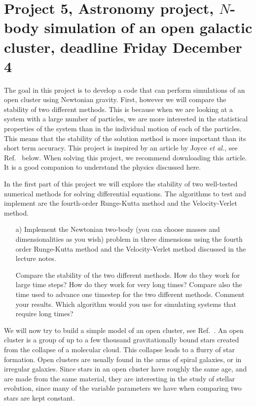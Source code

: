 \documentclass[11pt,a4wide]{article}
\begin{document}
\section*{Project 5, Astronomy project, $N$-body simulation of an open galactic cluster, deadline  Friday December 4}




The goal in this project is to develop a code that can perform simulations of an
open cluster using Newtonian gravity. First, however we will compare
the stability of two different methods. This is because when we are
looking at a system with a large number of particles, we are more
interested in the statistical properties of the system than in the
individual motion of each of the particles. This means that the
stability of the solution method is more important than its short term
accuracy.  This project is inspired by an article by Joyce {\em et al.}, see Ref.~\cite{joyce2010} below.
When  solving this project, we recommend downloading this article. It is a good companion to understand the 
physics discussed here. 

In the first part of this project we will explore the stability of two
well-tested numerical methods for solving differential equations. The algorithms to test and implement are the fourth-order Runge-Kutta method and the Velocity-Verlet method. 

\begin{enumerate}
\item[a)] Implement the Newtonian two-body (you can choose masses and dimensionalities as
  you wish) problem in three dimensions using the fourth order
  Runge-Kutta method and the Velocity-Verlet method discussed in
  the lecture notes.

 Compare the
stability of the two different methods. How do they work for large
time steps? How do they work for very long times? Compare also the
time used to advance one timestep for the two different
methods. Comment your results. Which algorithm would you use for
simulating systems that require long  times?

\end{enumerate}





We will now try to build a simple model of an open
cluster, see Ref.~\cite{openclusterref}. An
open cluster is a group of up to a few thousand gravitationally bound
stars created from the collapse of a molecular cloud. This collapse
leads to a flurry of star formation. Open clusters are usually found
in the arms of spiral galaxies, or in irregular galaxies. Since stars
in an open cluster have roughly the same age, and are made from the
same material, they are interesting in the study of stellar evolution,
since many of the variable parameters we have when comparing two stars
are kept constant.
\end{document}
